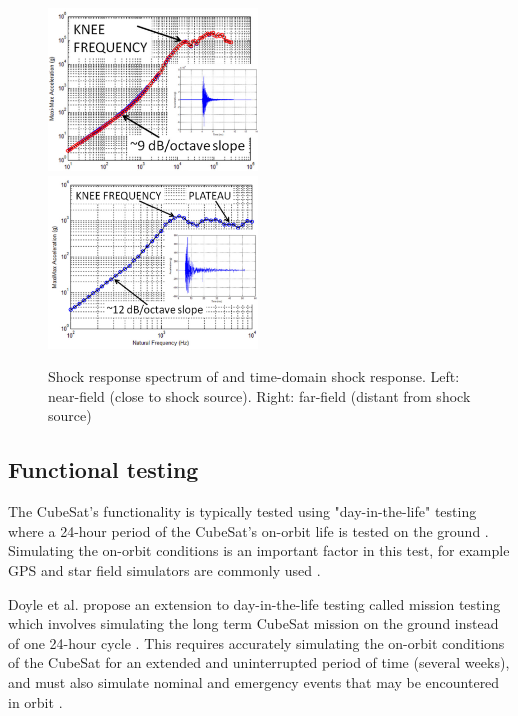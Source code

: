 \documentclass{report}
\begin{document}
\begin{figure}[H]
  \includegraphics[width=0.495\textwidth]{images/pyroshock2.png}
  \includegraphics[width=0.495\textwidth]{images/pyroshock1.png}
  \caption{Shock response spectrum of and time-domain shock response. Left: near-field (close to shock source). Right: far-field (distant from shock source) \cite{nasa-pyroshock}}
  \label{fig:pyroshock}
\end{figure}

\subsection{Functional testing}

The CubeSat's functionality is typically tested using "day-in-the-life" testing where a 24-hour period of the CubeSat's on-orbit life is tested on the ground \cite{venturini2018improving}. Simulating the on-orbit conditions is an important factor in this test, for example GPS and star field simulators are commonly used \cite{venturini2018improving}.

Doyle et al. propose an extension to day-in-the-life testing called mission testing which involves simulating the long term CubeSat mission on the ground instead of one 24-hour cycle \cite{doyle2021mission}. This requires accurately simulating the on-orbit conditions of the CubeSat for an extended and uninterrupted period of time (several weeks), and must also simulate nominal and emergency events that may be encountered in orbit \cite{doyle2021mission}.
\end{document}
